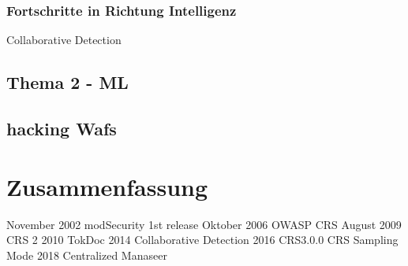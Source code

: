 \subsubsection{Fortschritte in Richtung Intelligenz}

Collaborative Detection \cite{karakannas2014}


\subsection{Thema 2 - ML}


\subsection{hacking Wafs}


\section{Zusammenfassung}



November 2002 modSecurity 1st release
Oktober 2006 OWASP CRS
August 2009 CRS 2
2010 TokDoc
2014 Collaborative Detection
2016 CRS3.0.0 CRS Sampling Mode
2018 Centralized Manaseer